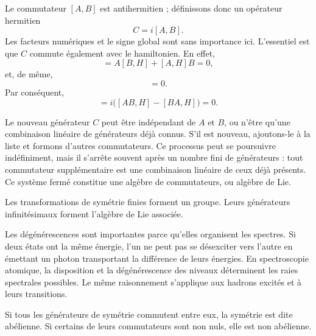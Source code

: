 Le commutateur \([A,B]\) est antihermitien ; définissons donc un opérateur hermitien
\begin{equation}
C=i[A,B].
\end{equation}
Les facteurs numériques et le signe global sont sans importance ici. L’essentiel est que \(C\) commute également avec le hamiltonien. En effet,
\begin{equation}
[AB,H]
=A[B,H]+[A,H]B=0,
\end{equation}
et, de même,
\begin{equation}
[BA,H]=0.
\end{equation}
Par conséquent,
\begin{equation}
[C,H]
=i\bigl([AB,H]-[BA,H]\bigr)=0.
\end{equation}

Le nouveau générateur \(C\) peut être indépendant de \(A\) et \(B\), ou n’être qu’une combinaison linéaire de générateurs déjà connus. S’il est nouveau, ajoutons-le à la liste et formons d’autres commutateurs. Ce processus peut se poursuivre indéfiniment, mais il s’arrête souvent après un nombre fini de générateurs : tout commutateur supplémentaire est une combinaison linéaire de ceux déjà présents. Ce système fermé constitue une algèbre de commutateurs, ou algèbre de Lie.

Les transformations de symétrie finies forment un groupe. Leurs générateurs infinitésimaux forment l’algèbre de Lie associée.

Les dégénérescences sont importantes parce qu’elles organisent les spectres. Si deux états ont la même énergie, l’un ne peut pas se désexciter vers l’autre en émettant un photon transportant la différence de leurs énergies. En spectroscopie atomique, la disposition et la dégénérescence des niveaux déterminent les raies spectrales possibles. Le même raisonnement s’applique aux hadrons excités et à leurs transitions.

\begin{classroomqa}
\end{classroomqa}

Si tous les générateurs de symétrie commutent entre eux, la symétrie est dite abélienne. Si certains de leurs commutateurs sont non nuls, elle est non abélienne.

